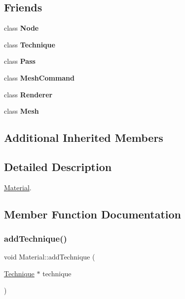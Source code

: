 \subsection*{Friends}
\begin{DoxyCompactItemize}
\item 
\mbox{\label{classMaterial_aed91756449328e2c454e53e9c5e53936}} 
class {\bfseries Node}
\item 
\mbox{\label{classMaterial_a0a6534d15d196a09d979b9b093c6836d}} 
class {\bfseries Technique}
\item 
\mbox{\label{classMaterial_abe77423eb27f643233ef051559a64882}} 
class {\bfseries Pass}
\item 
\mbox{\label{classMaterial_a9f8d65c15f716e15a8acedb603ab047b}} 
class {\bfseries Mesh\+Command}
\item 
\mbox{\label{classMaterial_a7482e5338f9824f1190a0846d209c666}} 
class {\bfseries Renderer}
\item 
\mbox{\label{classMaterial_ac9b3996998332cf8a503b4fbcaa6b200}} 
class {\bfseries Mesh}
\end{DoxyCompactItemize}
\subsection*{Additional Inherited Members}


\subsection{Detailed Description}
\hyperlink{classMaterial}{Material}. 

\subsection{Member Function Documentation}
\mbox{\label{classMaterial_a88f5ba975802241aa0ce984257b8a56a}} 
\subsubsection{\texorpdfstring{add\+Technique()}{addTechnique()}\hspace{0.1cm}{\footnotesize\ttfamily [1/2]}}
{\footnotesize\ttfamily void Material\+::add\+Technique (\begin{DoxyParamCaption}\item[{\hyperlink{classTechnique}{Technique} $\ast$}]{technique }\end{DoxyParamCaption})}


